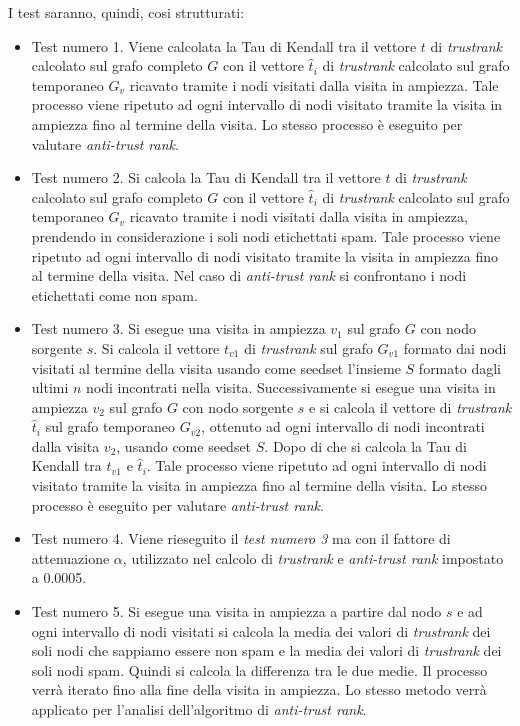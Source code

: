 I test saranno, quindi, cosi strutturati:
\begin{itemize}
 \item Test numero 1. Viene calcolata la Tau di Kendall tra il  vettore \(t\) di \textit{trustrank} calcolato sul grafo completo \(G\) con il vettore \(\hat{t}_i\) di \textit{trustrank} calcolato sul grafo temporaneo \(G_v\) ricavato tramite i nodi visitati dalla visita in ampiezza. Tale processo viene ripetuto ad ogni intervallo di nodi visitato tramite la visita in ampiezza fino al termine della visita. Lo stesso processo è eseguito per valutare \textit{anti-trust rank}.
 
 \item Test numero 2. Si calcola la Tau di Kendall tra il vettore \(t\)  di \textit{trustrank} calcolato sul grafo completo \(G\) con il vettore \(\hat{t}_i\) di \textit{trustrank} calcolato sul grafo temporaneo \(G_v\) ricavato tramite i nodi visitati dalla visita in ampiezza, prendendo in considerazione i soli nodi etichettati spam.  Tale processo viene ripetuto ad ogni intervallo di nodi visitato tramite la visita in ampiezza fino al termine della visita. Nel caso di \textit{anti-trust rank} si  confrontano i nodi etichettati come non spam.
 
 \item Test numero 3. Si esegue una visita in ampiezza \(v_1\) sul grafo \(G\) con nodo sorgente \(s\). Si calcola il vettore \(t_{v1}\) di \textit{trustrank} sul grafo \(G_{v1}\) formato dai nodi visitati al termine della visita usando come seedset l'insieme \(S\) formato dagli ultimi \(n\) nodi incontrati nella visita. Successivamente si esegue una visita in ampiezza \(v_2\) sul grafo \(G\) con nodo sorgente \(s\) e si calcola il vettore di \textit{trustrank} \(\hat{t}_i\) sul grafo temporaneo \(G_{v2}\), ottenuto ad ogni intervallo di nodi incontrati dalla visita \(v_2\), usando come seedset \(S\). Dopo di che si calcola la Tau di Kendall tra \(t_{v1}\) e \(\hat{t}_i\). Tale processo viene ripetuto ad ogni intervallo di nodi visitato tramite la visita in ampiezza fino al termine della visita. Lo stesso processo è eseguito per valutare \textit{anti-trust rank}.
 
 \item Test numero 4. Viene rieseguito il \textit{test numero 3} ma con il fattore di attenuazione \(\alpha\), utilizzato nel calcolo di \textit{trustrank} e \textit{anti-trust rank} impostato a 0.0005.
 
 \item Test numero 5. Si esegue una visita in ampiezza a partire dal nodo \(s\) e ad ogni intervallo di nodi visitati si calcola la media dei valori di \textit{trustrank} dei soli nodi che sappiamo essere non spam e la media dei valori di \textit{trustrank} dei soli nodi spam. Quindi si calcola la differenza tra le due medie. Il processo verrà iterato fino alla fine della visita in ampiezza. Lo stesso metodo verrà applicato per l'analisi dell'algoritmo di \textit{anti-trust rank}.
 

\end{itemize}
